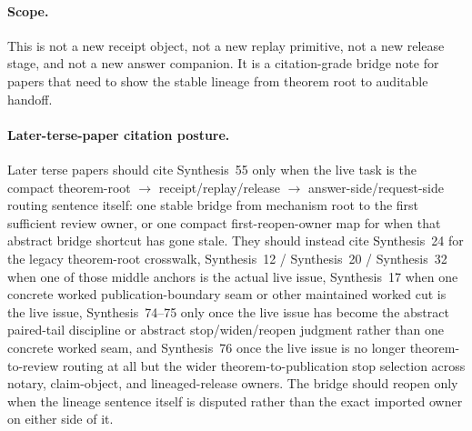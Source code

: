 \documentclass[11pt]{article}
\begin{document}
\paragraph{Scope.}
This is not a new receipt object, not a new replay primitive, not a new release stage, and not a new answer companion.
It is a citation-grade bridge note for papers that need to show the stable lineage from theorem root to auditable handoff.
\paragraph{Later-terse-paper citation posture.}
Later terse papers should cite Synthesis~55 only when the live task is the compact theorem-root $\to$ receipt/replay/release $\to$ answer-side/request-side routing sentence itself: one stable bridge from mechanism root to the first sufficient review owner, or one compact first-reopen-owner map for when that abstract bridge shortcut has gone stale. They should instead cite Synthesis~24 for the legacy theorem-root crosswalk, Synthesis~12 / Synthesis~20 / Synthesis~32 when one of those middle anchors is the actual live issue, Synthesis~17 when one concrete worked publication-boundary seam or other maintained worked cut is the live issue, Synthesis~74--75 only once the live issue has become the abstract paired-tail discipline or abstract stop/widen/reopen judgment rather than one concrete worked seam, and Synthesis~76 once the live issue is no longer theorem-to-review routing at all but the wider theorem-to-publication stop selection across notary, claim-object, and lineaged-release owners. The bridge should reopen only when the lineage sentence itself is disputed rather than the exact imported owner on either side of it.\cite{series:mathcrosswalk,series:receiptitems,series:auditorreplay,series:releasespine,series:workedexample,series:pairedterminalcitationdiscipline,series:pairedterminalcutoverrules,series:theoremtopublicationspine}
\end{document}

